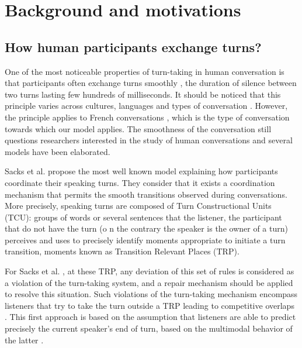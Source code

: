 
\section{Background and motivations}
\label{backgd}

\subsection{How human participants exchange turns?}
\label{social_psychology}

One of the most noticeable properties of turn-taking in human conversation is that participants often exchange turns
smoothly \citep{heldner_pauses_2010}, the duration of silence between two turns
lasting few hundreds of milliseconds. 
It should be noticed that this principle
varies across cultures, languages and types of conversation \citep{oconnell_turntaking_2008,stivers_universals_2009}.
However, the principle applies to French conversations \citep{mondada_multimodal_2007}, 
which is the type of conversation towards which our model applies.
The smoothness of the conversation still questions researchers interested in the study of human conversations 
and several models have been elaborated. %
 

Sacks et al. \citep{sacks_simplest_1974} propose the most well known model explaining how participants coordinate their speaking turns.
They consider that it exists a coordination mechanism that permits the smooth transitions observed during conversations.
More precisely, speaking turns are composed of Turn Constructional Units (TCU): groups of words or several sentences that the listener, the participant that do not have the turn (o n the contrary the speaker is the owner of a turn) perceives and uses to precisely identify moments appropriate to initiate a turn transition, moments known as Transition Relevant Places (TRP).

For Sacks et al. \citep{sacks_simplest_1974}, at these TRP, any deviation of this set of rules is considered
as a violation of the turn-taking system, and a
repair mechanism should be applied to resolve this situation.
Such violations of the turn-taking mechanism
encompass listeners that try to take the turn outside a
TRP leading to competitive overlaps \citep{schegloff_overlapping_2000}.
This first approach is based on the assumption that
listeners are able to predict precisely the current speaker's end of turn, based on the multimodal behavior
of the latter \citep{de_ruiter_projecting_2006,french_turn-competitive_1983,ford_interactional_1996,mondada_multimodal_2007}. 

